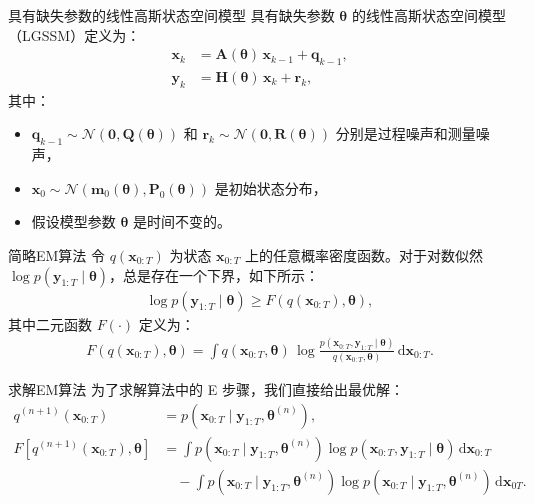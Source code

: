 \documentclass[presentation,aspectratio=169]{ctexbeamer}
\begin{document}
\begin{frame}{具有缺失参数的线性高斯状态空间模型}
具有缺失参数 \(\boldsymbol{\theta}\) 的线性高斯状态空间模型（LGSSM）定义为：
\begin{align}
    \mathbf{x}_k &= \mathbf{A}(\boldsymbol{\theta}) \, \mathbf{x}_{k-1} + \mathbf{q}_{k-1}, \\
    \mathbf{y}_k &= \mathbf{H}(\boldsymbol{\theta}) \, \mathbf{x}_k + \mathbf{r}_k,
\end{align}
\pause
其中：
\begin{itemize}
    \item \(\mathbf{q}_{k-1} \sim \mathcal{N}(\mathbf{0}, \mathbf{Q}(\boldsymbol{\theta}))\) 和 \(\mathbf{r}_{k} \sim \mathcal{N}(\mathbf{0}, \mathbf{R}(\boldsymbol{\theta}))\) 分别是过程噪声和测量噪声，
    \item \(\mathbf{x}_0 \sim \mathcal{N}(\mathbf{m}_0(\boldsymbol{\theta}), \mathbf{P}_0(\boldsymbol{\theta}))\) 是初始状态分布，
    \item 假设模型参数 \(\boldsymbol{\theta}\) 是时间不变的。
\end{itemize}
\end{frame}

\begin{frame}{简略EM算法}
令 \(q(\mathbf{x}_{0:T})\) 为状态 \(\mathbf{x}_{0:T}\) 上的任意概率密度函数。对于对数似然 \(\log p(\mathbf{y}_{1:T} \mid \boldsymbol{\theta})\)，总是存在一个下界，如下所示：
\begin{align}
    \log p(\mathbf{y}_{1:T} \mid \boldsymbol{\theta}) \ge F(q(\mathbf{x}_{0:T}), \boldsymbol{\theta}), \label{eq: ineq for EM}
\end{align}
其中二元函数 \(F(\cdot)\) 定义为：
\begin{align}
    F(q(\mathbf{x}_{0:T}), \boldsymbol{\theta}) = \int q(\mathbf{x}_{0:T}, \boldsymbol{\theta}) \, \log \frac{p(\mathbf{x}_{0:T}, \mathbf{y}_{1:T} \mid \boldsymbol{\theta})}{q(\mathbf{x}_{0:T}, \boldsymbol{\theta})} \, \mathrm{d} \mathbf{x}_{0:T}.
\end{align}
\end{frame}

\begin{frame}{求解EM算法}
为了求解算法中的 E 步骤，我们直接给出最优解：
\begin{align}
    q^{(n+1)}(\mathbf{x}_{0:T}) &= p(\mathbf{x}_{0:T} \mid \mathbf{y}_{1:T}, \boldsymbol{\theta}^{(n)}), \\
    F[q^{(n+1)}(\mathbf{x}_{0:T}), \boldsymbol{\theta}] &= \int p(\mathbf{x}_{0:T} \mid \mathbf{y}_{1:T}, \boldsymbol{\theta}^{(n)}) \log p(\mathbf{x}_{0:T}, \mathbf{y}_{1:T} \mid \boldsymbol{\theta}) \, \mathrm{d} \mathbf{x}_{0:T} \label{eq: full lower bound} \\
    &\quad - \int p(\mathbf{x}_{0:T} \mid \mathbf{y}_{1:T}, \boldsymbol{\theta}^{(n)}) \log p(\mathbf{x}_{0:T} \mid \mathbf{y}_{1:T}, \boldsymbol{\theta}^{(n)}) \, \mathrm{d} \mathbf{x}_{0{T}}. \nonumber
\end{align}
\end{frame}
\end{document}
